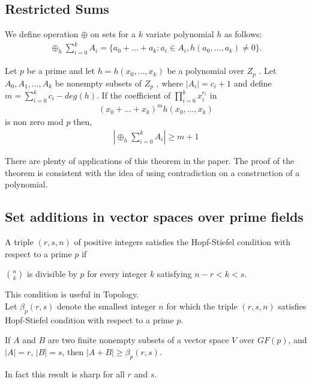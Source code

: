 \subsection{Restricted Sums}
We define operation $\oplus$ on sets for a $k$ variate polynomial $h$ as follows:
\begin{align*}
	\oplus_h \sum_{i=0}^{k}A_i = \{a_0 + \ldots + a_k : a_i \in A_i, h(a_0,\ldots,a_k) \neq 0\}.
\end{align*}
\begin{theorem}
	Let $p$ be a prime and let $h = h(x_0 , \ldots , x_k)$ be a polynomial over $Z_p$ . Let $A_0, A_1 , \ldots , A_k$ be nonempty subsets of $Z_p$ , where $|A_i| = c_i + 1$ and define $m = \sum_{i=0}^{k}c_i - deg(h)$. If the coefficient of $\prod_{i=0}^{k}x_i^{c_i}$ in
	\begin{align*}
		{(x_0+\ldots+x_k)}^mh(x_0 , \ldots , x_k)
	\end{align*}
	is non zero mod $p$ then,
	\begin{align*}
		|\oplus_h \sum_{i=0}^{k}A_i | \geq m+1
	\end{align*}
\end{theorem}
There are plenty of applications of this theorem in the paper. The proof of the theorem is consistent with the idea of using contradiction on a construction of a polynomial.

\subsection{Set additions in vector spaces over prime fields}
A triple $(r, s, n)$ of positive integers satisfies the Hopf-Stiefel condition with respect to a prime $p$ if
\begin{center} 
	$\binom{n}{k}$ is divisible by $p$ for every integer $k$ satisfying $n-r < k < s$.
\end{center}
This condition is useful in Topology.
\\
Let $\beta_p(r, s)$ denote the smallest integer $n$ for which the triple $(r, s, n)$ satisfies Hopf-Stiefel condition with respect to a prime $p$.
\begin{theorem}
	If $A$ and $B$ are two finite nonempty subsets of a vector space $V$ over $GF(p)$, and $|A| = r$, $|B| = s$, then $|A + B| \geq \beta_p(r, s)$.
\end{theorem}
In fact this result is sharp for all $r$ and $s$.


